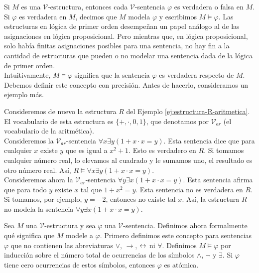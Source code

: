 \message{ !name(main.tex)}\documentclass[12pt,a4paper]{book}
\newcommand{\VV}{\mathcal{V}}
\begin{document}
    Si $M$ es una $\VV$-estructura, entonces cada $\VV$-sentencia $\varphi$ es verdadera o falsa en $M$. Si $\varphi$ es
    verdadera en $M$, decimos que $M$ modela $\varphi$ y escribimos $M\models\varphi$. Las estructuras en lógica de primer
    orden desempeñan un papel análogo al de las asignaciones en lógica proposicional. Pero mientras que, en lógica
    proposicional, solo había finitas asignaciones posibles para una sentencia, no hay fin a la cantidad de estructuras que
    pueden o no modelar una sentencia dada de la lógica de primer orden.\\
    Intuitivamente, $M\models\varphi$ significa que la sentencia $\varphi$ es verdadera respecto de $M$. Debemos definir
    este concepto con precisión. Antes de hacerlo, consideramos un ejemplo más.

    \begin{ejemplo}\label{ej:var-sentencia}
        Consideremos de nuevo la estructura $R$ del Ejemplo \ref{ej:estructura-R-aritmetica}. El vocabulario de esta
        estructura es $\{+,\cdot,0,1\}$, que denotamos por $\VV_{ar}$ (el vocabulario de la aritmética).\\
        Consideremos la $\VV_{ar}$-sentencia $\forall x\exists y(1+x\cdot x=y)$. Esta sentencia dice que para cualquier $x$
        existe $y$ que es igual a $x^{2}+1$. Esto es verdadero en $R$. Si tomamos cualquier número real, lo elevamos al
        cuadrado y le sumamos uno, el resultado es otro número real. Así, $R\models\forall x\exists y(1+x\cdot x=y)$.\\
        Consideremos ahora la $\VV_{ar}$-sentencia $\forall y\exists x(1+x\cdot x=y)$. Esta sentencia afirma que para todo
        $y$ existe $x$ tal que $1+x^{2}=y$. Esta sentencia no es verdadera en $R$. Si tomamos, por ejemplo, $y=-2$, entonces
        no existe tal $x$. Así, la estructura $R$ no modela la sentencia $\forall y\exists x(1+x\cdot x=y)$.
    \end{ejemplo}

    Sea $M$ una $\VV$-estructura y sea $\varphi$ una $\VV$-sentencia. Definimos ahora formalmente qué significa que $M$
    modele a $\varphi$. Primero definimos este concepto para sentencias $\varphi$ que no contienen las abreviaturas $\vee$,
    $\rightarrow$, $\leftrightarrow$ ni $\forall$. Definimos $M\models\varphi$ por inducción sobre el número total de ocurrencias de
    los símbolos $\wedge$, $\neg$ y $\exists$. Si $\varphi$ tiene cero ocurrencias de estos símbolos, entonces $\varphi$ es
    atómica.
\end{document}
